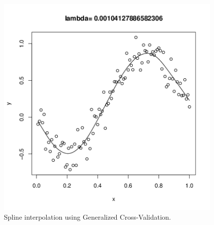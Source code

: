 \documentclass[11pt]{article}
\begin{document}
\begin{homeworkProblem}
\begin{figure}[!ht]
            \begin{centering}
            \includegraphics[scale=0.8]{gcv_fit.png}

            \caption{Spline interpolation using Generalized Cross-Validation.}

            \end{centering}
        \end{figure}

\end{homeworkProblem}
\end{document}
